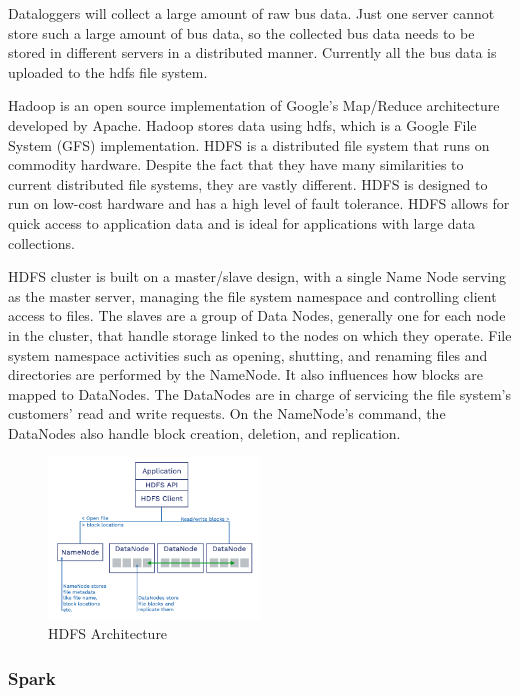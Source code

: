 Dataloggers will collect a large amount of raw bus data. Just one server cannot store such a large amount of bus data, so the collected bus data needs to be stored in different servers in a distributed manner. Currently all the bus data is uploaded to the \ac{hdfs} file system.

Hadoop is an open source implementation of Google's Map/Reduce architecture developed by Apache\cite{6558077}. Hadoop stores data using \ac{hdfs}, which is a Google File System (GFS) implementation. HDFS is a distributed file system that runs on commodity hardware. Despite the fact that they have many similarities to current distributed file systems, they are vastly different. HDFS is designed to run on low-cost hardware and has a high level of fault tolerance\cite{179858}. HDFS allows for quick access to application data and is ideal for applications with large data collections.

HDFS cluster is built on a master/slave design, with a single Name Node serving as the master server, managing the file system namespace and controlling client access to files\cite{hadoop_file_system}. The slaves are a group of Data Nodes, generally one for each node in the cluster, that handle storage linked to the nodes on which they operate\cite{6558077}. File system namespace activities such as opening, shutting, and renaming files and directories are performed by the NameNode. It also influences how blocks are mapped to DataNodes. The DataNodes are in charge of servicing the file system's customers' read and write requests. On the NameNode's command, the DataNodes also handle block creation, deletion, and replication\cite{hadoop}.

\begin{figure}[hbt!]
    \centering
    \includegraphics[width=0.5\textwidth]{gfx/hdfspng.png}
    \caption{HDFS Architecture\cite{HDFS_Architecture}}
    \label{fig:hdfs_architecture}
\end{figure}

\subsubsection{Spark}

